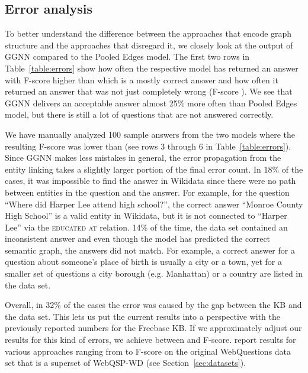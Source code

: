 \documentclass[11pt]{article}
\begin{document}
\subsection{Error analysis}
\label{sec:error}

To better understand the difference between the approaches that encode graph structure and the approaches that disregard it, we closely look at the output of GGNN compared to the Pooled Edges model. The first two rows in Table~\ref{table:errors} show how often the respective model has returned an answer with F-score higher than  which is a mostly correct answer and how often it returned an answer that was not just completely wrong (F-score ). We see that GGNN delivers an acceptable answer almost 25\% more often than Pooled Edges model, but there is still a lot of questions that are not answered correctly.

We have manually analyzed 100 sample answers from the two models where the resulting F-score was lower than  (see rows 3 through 6 in  Table~\ref{table:errors}). Since GGNN makes less mistakes in general, the error propagation from the entity linking takes a slightly larger portion of the final error count. In 18\% of the cases, it was impossible to find the answer in Wikidata since there were no path between entities in the question and the answer. For example, for the question ``Where did Harper Lee attend high school?'', the correct answer ``Monroe County High School'' is a valid entity in Wikidata, but it is not connected to ``Harper Lee'' via the \textsc{educated at} relation. 14\% of the time, the data set contained an inconsistent answer and even though the model has predicted the correct semantic graph, the answers did not match. For example, a correct answer for a question about someone's place of birth is usually a city or a town, yet for a smaller set of questions a city borough (e.g. Manhattan) or a country are listed in the data set. 

Overall, in 32\% of the cases the error was caused by the gap between the KB and the data set. 
This lets us put the current results into a perspective with the previously reported numbers for the Freebase KB. If we approximately adjust our results for this kind of errors, we achieve between  and  F-score.  report results for various approaches ranging from  to  F-score on the original WebQuestions data set that is a superset of WebQSP-WD (see Section~\ref{sec:datasets}). 
\end{document}
